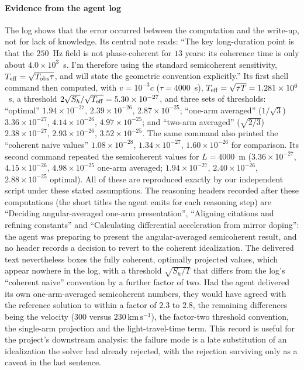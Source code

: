 \paragraph*{Evidence from the agent log}
The log shows that the error occurred between the computation and the write-up, not for lack of knowledge. Its central note reads: ``The key long-duration point is that the $250$~Hz field is not phase-coherent for $13$ years: its coherence time is only about $4.0\times10^3$~s. I'm therefore using the standard semicoherent sensitivity, $T_{\rm eff}=\sqrt{T_{\rm obs}\tau}$, and will state the geometric convention explicitly.'' Its first shell command then computed, with $v=10^{-3}c$ ($\tau=4000$~s), $T_{\rm eff}=\sqrt{\tau T}=1.281\times10^{6}$~s, a threshold $2\sqrt{S_h}/\sqrt{T_{\rm eff}}=5.30\times10^{-27}$, and three sets of thresholds: ``optimal'' $1.94\times10^{-27}$, $2.39\times10^{-26}$, $2.87\times10^{-25}$; ``one-arm averaged'' ($1/\sqrt3$) $3.36\times10^{-27}$, $4.14\times10^{-26}$, $4.97\times10^{-25}$; and ``two-arm averaged'' ($\sqrt{2/3}$) $2.38\times10^{-27}$, $2.93\times10^{-26}$, $3.52\times10^{-25}$. The same command also printed the ``coherent naive values'' $1.08\times10^{-28}$, $1.34\times10^{-27}$, $1.60\times10^{-26}$ for comparison. Its second command repeated the semicoherent values for $L=4000$~m ($3.36\times10^{-27}$, $4.15\times10^{-26}$, $4.98\times10^{-25}$ one-arm averaged; $1.94\times10^{-27}$, $2.40\times10^{-26}$, $2.88\times10^{-25}$ optimal). All of these are reproduced exactly by our independent script under these stated assumptions. The reasoning headers recorded after these computations (the short titles the agent emits for each reasoning step) are ``Deciding angular-averaged one-arm presentation'', ``Aligning citations and refining constants'' and ``Calculating differential acceleration from mirror doping'': the agent was preparing to present the angular-averaged semicoherent result, and no header records a decision to revert to the coherent idealization. The delivered text nevertheless boxes the fully coherent, optimally projected values, which appear nowhere in the log, with a threshold $\sqrt{S_h/T}$ that differs from the log's ``coherent naive'' convention by a further factor of two. Had the agent delivered its own one-arm-averaged semicoherent numbers, they would have agreed with the reference solution to within a factor of $2.3$ to $2.8$, the remaining differences being the velocity ($300$ versus $230\,\mathrm{km\,s^{-1}}$), the factor-two threshold convention, the single-arm projection and the light-travel-time term. This record is useful for the project's downstream analysis: the failure mode is a late substitution of an idealization the solver had already rejected, with the rejection surviving only as a caveat in the last sentence.

